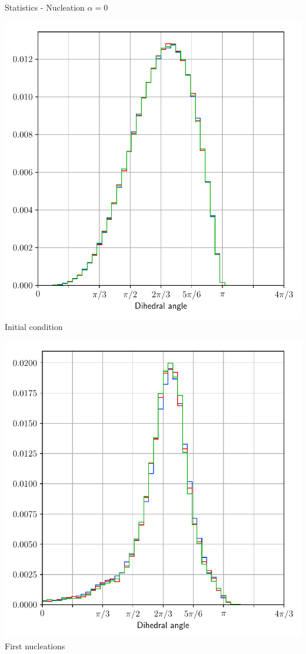 \documentclass[usenames,dvipsnames]{beamer}
\begin{document}
\begin{frame}{Statistics - Nucleation $\alpha = 0$}
\small
    \begin{minipage}{0.5\textwidth}
    \centering
    \includegraphics[scale=0.35]{figures/stored_energy/SE/dihedral/000000_nuclconstant_set.pdf}\\
    Initial condition
    \end{minipage}%
    \begin{minipage}{0.5\textwidth}
    \centering
    \includegraphics[scale=0.35]{figures/stored_energy/SE/dihedral/000070_nuclconstant_set.pdf}\\
    First nucleations
    \end{minipage}
\end{frame}
\end{document}
